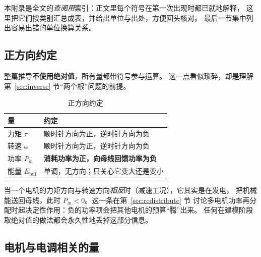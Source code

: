 \documentclass[cn,blue,11pt,device=normal]{elegantnote}
\newcommand{\Pin}{P_{\mathrm{in}}{}}
\newcommand{\Ebuf}{E_{\mathrm{buf}}{}}
\begin{document}
本附录是全文的\emph{查阅用}索引：正文里每个符号在第一次出现时都已就地解释，
这里把它们按类别汇总成表，并给出单位与出处，方便回头核对。
最后一节集中列出容易出错的单位换算关系。

\subsection{正方向约定}



整篇推导\textbf{不使用绝对值}，所有量都带符号参与运算。
这一点看似琐碎，却是理解第~\ref{sec:inverse} 节“两个根”问题的前提。

\begin{table}[htbp]
  \centering
  \small
  \caption{正方向约定}
  \label{tab:sign}
  \begin{tabular}{@{}>{\raggedright\arraybackslash}p{}>{\raggedright\arraybackslash}p{}@{}}
    \toprule
    量 & 约定 \\
    \midrule
    力矩 $\tau$   & 顺时针方向为正，逆时针方向为负 \\
    转速 $\omega$ & 顺时针方向为正，逆时针方向为负 \\
    功率 $\Pin$   & \textbf{消耗功率为正，向母线回馈功率为负} \\
    能量 $\Ebuf$  & 单调，无方向；只关心它变大还是变小 \\
    \bottomrule
  \end{tabular}
\end{table}

\begin{remark}
当一个电机的力矩方向与转速方向\emph{相反}时（减速工况），它其实是在发电，
把机械能送回母线，此时 $\Pin<0$。这一条在第~\ref{sec:redistribute} 节
讨论多电机功率再分配时起决定性作用：负的功率项会把其他电机的预算“腾”出来。
任何在建模阶段取绝对值的做法都会永久性地丢掉这部分信息。
\end{remark}

\subsection{电机与电调相关的量}
\end{document}
